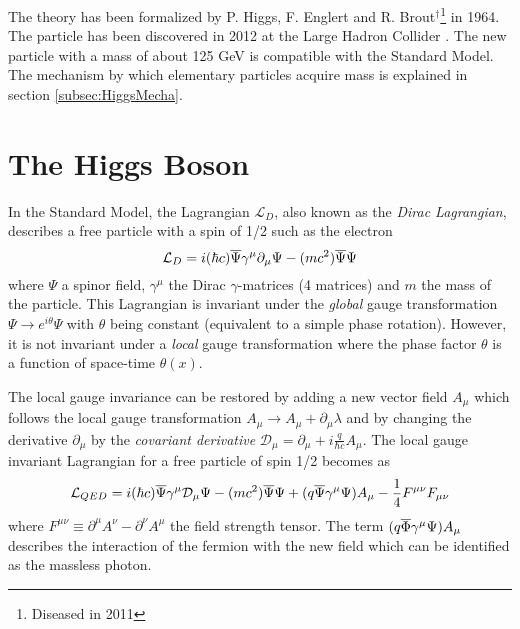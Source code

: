 The theory \cite{Higgs:1964pj, Englert:1964et} has been formalized by P. Higgs, F. Englert and R. Brout$^\dagger$\footnote{Diseased in 2011} in 1964. The particle has been discovered in 2012 at the Large Hadron Collider \cite{Aad:2012tfa, Chatrchyan:2012xdj}. The new particle with a mass of about 125 GeV is compatible with the Standard Model. The mechanism by which elementary particles acquire mass is explained in section \ref{subsec:HiggsMecha}.

\section{The Higgs Boson}
\label{sec:HiggsTheo}

In the Standard Model, the Lagrangian $\mathcal{L}_{D}$, also known as the \textit{Dirac Lagrangian}, describes a free particle with a spin of 1/2 such as the electron \cite{Griffiths:343277}
\begin{equation}
  \mathcal{L}_{D} = i(\hbar c)\overline{\rm \Psi}\gamma^{\mu}\partial_{\mu}\Psi - (mc^2)\overline{\rm \Psi}\Psi
\end{equation}
where $\Psi$ a spinor field, $\gamma^{\mu}$ the Dirac $\gamma$-matrices (4 matrices) \cite{Peskin:1995ev} and $m$ the mass of the particle. This Lagrangian is invariant under the \textit{global} gauge transformation $\Psi \rightarrow e^{i\theta}\Psi$ with $\theta$ being constant (equivalent to a simple phase rotation). However, it is not invariant under a \textit{local} gauge transformation where the phase factor $\theta$ is a function of space-time $\theta(x)$.

The local gauge invariance can be restored by adding a new vector field $A_{\mu}$ which follows the local gauge transformation $A_{\mu} \rightarrow A_{\mu} + \partial_{\mu}\lambda$ and by changing the derivative $\partial_{\mu}$ by the \textit{covariant derivative} $\mathcal{D}_{\mu} = \partial_{\mu} + i\frac{q}{\hbar c}A_{\mu}$. The local gauge invariant Lagrangian for a free particle of spin 1/2 becomes as \cite{Griffiths:343277}
\begin{equation}
  \mathcal{L}_{QED} = i(\hbar c)\overline{\rm \Psi}\gamma^{\mu}\mathcal{D}_{\mu}\Psi - (mc^2)\overline{\rm \Psi}\Psi + (q\overline{\rm \Psi}\gamma^{\mu}\Psi)A_{\mu} - \frac{1}{4}F^{\mu\nu}F_{\mu\nu}
\end{equation}
where $F^{\mu\nu} \equiv \partial^{\mu}A^{\nu} - \partial^{\nu}A^{\mu}$ the field strength tensor. The term $(q\overline{\rm \Phi}\gamma^{\mu}\Psi)A_{\mu}$ describes the interaction of the fermion with the new field which can be identified as the massless photon.

